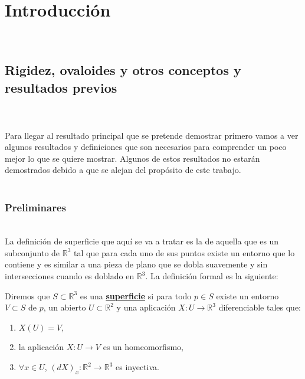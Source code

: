 \chapter{Introducción}


${ }$\\
\section{Rigidez, ovaloides y otros conceptos y resultados previos}
${ }$\\
${ }$\\


Para llegar al resultado principal que se pretende demostrar primero vamos a ver algunos resultados y definiciones que son necesarios para comprender un poco mejor lo que se quiere mostrar. Algunos de estos resultados no estarán demostrados debido a que se alejan del propósito de este trabajo.
${ }$\\



${ }$\\
\subsection{Preliminares}
${ }$\\


La definición de superficie que aquí se va a tratar es la de aquella que es un subconjunto de $\mathbb{R}^3$ tal que para cada uno de sus puntos existe un entorno que lo contiene y es similar a una pieza de plano que se dobla suavemente y sin intersecciones cuando es doblado en $\mathbb{R}^3$. La definición formal es la siguiente:
${ }$\\

\begin{definicion}
	Diremos que $S \subset \mathbb{R}^3$ es una \underline{\textbf{superficie}} si para todo $p \in S$ existe un entorno $V \subset S$ de $p$, un abierto $U \subset \mathbb{R}^2$ y una aplicación $X : U \to \mathbb{R}^3$ diferenciable tales que:
	\begin{enumerate}
		\item $X(U) = V$,
		\item la aplicación $X : U \to V$ es un homeomorfismo,
		\item $\forall x \in U$, $(dX)_x : \mathbb{R}^2 \to \mathbb{R}^3$ es inyectiva.
	\end{enumerate}
\end{definicion}
${ }$\\

